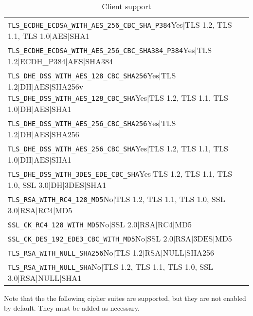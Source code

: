 \begin{table}[h]
\begin{tabular}{ll}
\verb |TLS_ECDHE_ECDSA_WITH_AES_256_CBC_SHA_P384|Yes|TLS 1.2, TLS 1.1, TLS 1.0|AES|SHA1\\
\verb |TLS_ECDHE_ECDSA_WITH_AES_256_CBC_SHA384_P384|Yes|TLS 1.2|ECDH_P384|AES|SHA384\\
\verb |TLS_DHE_DSS_WITH_AES_128_CBC_SHA256|Yes|TLS 1.2|DH|AES|SHA256v
\verb |TLS_DHE_DSS_WITH_AES_128_CBC_SHA|Yes|TLS 1.2, TLS 1.1, TLS 1.0|DH|AES|SHA1\\
\verb |TLS_DHE_DSS_WITH_AES_256_CBC_SHA256|Yes|TLS 1.2|DH|AES|SHA256\\
\verb |TLS_DHE_DSS_WITH_AES_256_CBC_SHA|Yes|TLS 1.2, TLS 1.1, TLS 1.0|DH|AES|SHA1\\
\verb |TLS_DHE_DSS_WITH_3DES_EDE_CBC_SHA|Yes|TLS 1.2, TLS 1.1, TLS 1.0, SSL 3.0|DH|3DES|SHA1\\
\verb |TLS_RSA_WITH_RC4_128_MD5|No|TLS 1.2, TLS 1.1, TLS 1.0, SSL 3.0|RSA|RC4|MD5\\
\verb |SSL_CK_RC4_128_WITH_MD5|No|SSL 2.0|RSA|RC4|MD5\\
\verb |SSL_CK_DES_192_EDE3_CBC_WITH_MD5|No|SSL 2.0|RSA|3DES|MD5\\
\verb |TLS_RSA_WITH_NULL_SHA256|No|TLS 1.2|RSA|NULL|SHA256\\
\verb |TLS_RSA_WITH_NULL_SHA|No|TLS 1.2, TLS 1.1, TLS 1.0, SSL 3.0|RSA|NULL|SHA1\\
 \bottomrule 
 \end{tabular}
  \caption{Client support}
  \label{tab:MS_IIS_Client_Support}
\end{table}
Note that the the following cipher suites are supported, but they are not enabled by default.
They must be added as necessary. 

